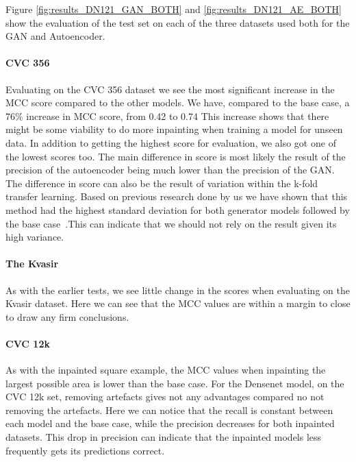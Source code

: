 %
Figure \ref{fig:results_DN121_GAN_BOTH} and \ref{fig:results_DN121_AE_BOTH} show the evaluation of the test set on each of the three datasets used both for the GAN and Autoencoder. 

\paragraph{CVC 356}
Evaluating on the CVC 356 dataset we see the most significant increase in the MCC score compared to the other models. 
We have, compared to the base case, a 76\% increase in MCC score, from 0.42 to 0.74
This increase shows that there might be some viability to do more inpainting when training a model for unseen data.
In addition to getting the highest score for evaluation, we also got one of the lowest scores too. 
The main difference in score is most likely the result of the precision of the autoencoder being much lower than the precision of the GAN.
The difference in score can also be the result of variation within the k-fold transfer learning.
Based on previous research done by us we have shown that this method had the highest standard deviation for both generator models followed by the base case~\cite{Mathias2019IEEpaper}.This can indicate that we should not rely on the result given its high variance. 



\paragraph{The Kvasir}
As with the earlier tests, we see little change in the scores when evaluating on the Kvasir dataset. Here we can see that the MCC values are within a margin to close to draw any firm conclusions.



\paragraph{CVC 12k}
As with the inpainted square example, the MCC values when inpainting the largest possible area is lower than the base case.  For the Densenet model, on the CVC 12k set, removing artefacts gives not any advantages compared no not removing the artefacts. 
Here we can notice that the recall is constant between each model and the base case, while the precision decreases for both inpainted datasets. This drop in precision can indicate that the inpainted models less frequently gets its predictions correct. 


































